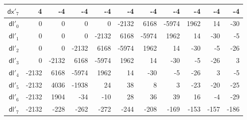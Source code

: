 \begin{table}[h]
{\begin{tabular}{r|rrrrrrrrrr}
      $\textsf{dx}'_{7}$ & 4 & -4 & -4 & -4 & -4 & -4 & -4 & -4 & -4 & -4 \\
      \hline
      $\textsf{dl}'_{0}$ & 0 & 0 & 0 & 0 & -2132 & 6168 & -5974 & 1962 & 14 & -30 \\
      $\textsf{dl}'_{1}$ & 0 & 0 & 0 & -2132 & 6168 & -5974 & 1962 & 14 & -30 & -5 \\
      $\textsf{dl}'_{2}$ & 0 & 0 & -2132 & 6168 & -5974 & 1962 & 14 & -30 & -5 & -26 \\
      $\textsf{dl}'_{3}$ & 0 & -2132 & 6168 & -5974 & 1962 & 14 & -30 & -5 & -26 & 3 \\
      $\textsf{dl}'_{4}$ & -2132 & 6168 & -5974 & 1962 & 14 & -30 & -5 & -26 & 3 & -5 \\
      $\textsf{dl}'_{5}$ & -2132 & 4036 & -1938 & 24 & 38 & 8 & 3 & -23 & -20 & -25 \\
      $\textsf{dl}'_{6}$ & -2132 & 1904 & -34 & -10 & 28 & 36 & 39 & 16 & -4 & -29 \\
      $\textsf{dl}'_{7}$ & -2132 & -228 & -262 & -272 & -244 & -208 & -169 & -153 & -157 & -186 \\
    \end{tabular}
  }
\end{table}

